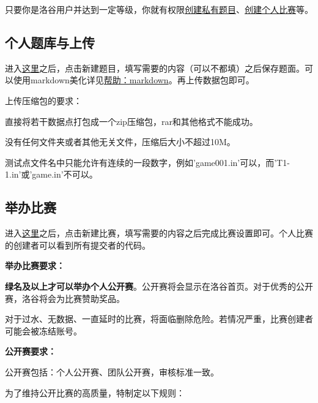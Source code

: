 \documentclass[10pt,a4paper]{article}
\begin{document}
	
	只要你是洛谷用户并达到一定等级，你就有权限\href{https://www.luogu.org/app/userproblem}{创建私有题目}、\href{https://www.luogu.org/app/userproblem}{创建个人比赛}等。
	
	\subsection{
		个人题库与上传}
	
	
	进入\href{https://www.luogu.org/app/userproblem}{这里}之后，点击新建题目，填写需要的内容（可以不都填）之后保存题面。可以使用markdown美化详见\href{https://www.luogu.org/wiki/show?name=%E5%B8%AE%E5%8A%A9%EF%BC%9Amarkdown}{帮助：markdown}。再上传数据包即可。
		
		
		上传压缩包的要求：
		\begin{itemize}{
				\item 
				
				
				直接将若干数据点打包成一个zip压缩包，rar和其他格式不能成功。
				\item 
				
				
				没有任何文件夹或者其他无关文件，压缩后大小不超过10M。
				\item 
				测试点文件名中只能允许有连续的一段数字，例如'game001.in'可以，而'T1-1.in'或'game.in'不可以。}
		\end{itemize}
		
		\subsection{
			举办比赛}
		
		
		进入\href{https://www.luogu.org/app/userproblem}{这里}之后，点击新建比赛，填写需要的内容之后完成比赛设置即可。个人比赛的创建者可以看到所有提交者的代码。
		
		\textbf{{
				举办比赛要求：}}
		\begin{itemize}{
				\item 
				
				\textbf{{
						绿名及以上才可以举办个人公开赛}}。公开赛将会显示在洛谷首页。对于优秀的公开赛，洛谷将会为比赛赞助奖品。
				\item 
				对于过水、无数据、一直延时的比赛，将面临删除危险。若情况严重，比赛创建者可能会被冻结账号。}
		\end{itemize}
		
		\textbf{{
				公开赛要求：}}
		
		
		公开赛包括：个人公开赛、团队公开赛，审核标准一致。
		
		
		为了维持公开比赛的高质量，特制定以下规则：
		
\end{document}
